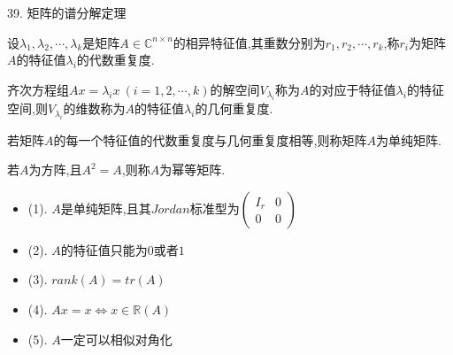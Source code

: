 39. 矩阵的谱分解定理
\begin{definition}[代数重复度]
	设$\lambda_{1},\lambda_{2},\cdots,\lambda_{k}$是矩阵$A\in \mathbb{C}^{n\times n}$的相异特征值,其重数分别为$r_{1},r_{2},\cdots,r_{k}$,称$r_{i}$为矩阵$A$的特征值$\lambda_{i}$的代数重复度.
\end{definition}
\begin{definition}[几何重复度]
	齐次方程组$Ax=\lambda_{i}x\ (i=1,2,\cdots,k)$的解空间$V_{\lambda_{i}}$称为$A$的对应于特征值$\lambda_{i}$的特征空间,则$V_{\lambda_{i}}$的维数称为$A$的特征值$\lambda_{i}$的几何重复度.
\end{definition}
\begin{definition}[单纯矩阵]
	若矩阵$A$的每一个特征值的代数重复度与几何重复度相等,则称矩阵$A$为单纯矩阵.
\end{definition}
\begin{definition}[幂等矩阵]
	若$A$为方阵,且$A^2=A$,则称$A$为幂等矩阵.
\end{definition}
\begin{property}[幂等矩阵$A$性质]
	\begin{itemize}
		\item (1). $A$是单纯矩阵,且其$Jordan$标准型为$\left(\begin{matrix}
			I_{r}&0\\0&0
		\end{matrix} \right) $
		\item (2). $A$的特征值只能为$0$或者$1$
		\item (3). $rank(A)=tr(A)$
		\item (4). $Ax=x\Leftrightarrow x\in\mathbb{R}(A)$
		\item (5). $A$一定可以相似对角化
	\end{itemize}
\end{property}
